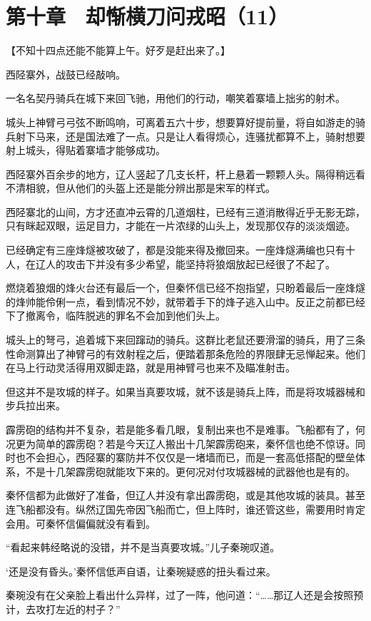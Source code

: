 \section{第十章　却惭横刀问戎昭（11）}

【不知十四点还能不能算上午。好歹是赶出来了。】

西陉寨外，战鼓已经敲响。

一名名契丹骑兵在城下来回飞驰，用他们的行动，嘲笑着寨墙上拙劣的射术。

城头上神臂弓弓弦不断鸣响，可离着五六十步，想要算好提前量，将自如游走的骑兵射下马来，还是国法难了一点。只是让人看得烦心，连骚扰都算不上，骑射想要射上城头，得贴着寨墙才能够成功。

西陉寨外百余步的地方，辽人竖起了几支长杆，杆上悬着一颗颗人头。隔得稍远看不清相貌，但从他们的头盔上还是能分辨出那是宋军的样式。

西陉寨北的山间，方才还直冲云霄的几道烟柱，已经有三道消散得近乎无影无踪，只有眯起双眼，运足目力，才能在一片浓绿的山头上，发现那仅存的淡淡烟迹。

已经确定有三座烽燧被攻破了，都是没能来得及撤回来。一座烽燧满编也只有十人，在辽人的攻击下并没有多少希望，能坚持将狼烟放起已经很了不起了。

燃烧着狼烟的烽火台还有最后一个，但秦怀信已经不抱指望，只盼着最后一座烽燧的烽帅能伶俐一点，看到情况不妙，就带着手下的烽子逃入山中。反正之前都已经下了撤离令，临阵脱逃的罪名不会加到他们头上。

城头上的弩弓，追着城下来回蹿动的骑兵。这群比老鼠还要滑溜的骑兵，用了三条性命测算出了神臂弓的有效射程之后，便踏着那条危险的界限肆无忌惮起来。他们在马上行动灵活得用双脚走路，就是用神臂弓也来不及瞄准射击。

但这并不是攻城的样子。如果当真要攻城，就不该是骑兵上阵，而是将攻城器械和步兵拉出来。

霹雳砲的结构并不复杂，若是能多看几眼，复制出来也不是难事。飞船都有了，何况更为简单的霹雳砲？若是今天辽人搬出十几架霹雳砲来，秦怀信也绝不惊讶。同时也不会担心，西陉寨的寨防并不仅仅是一堵墙而已，而是一套高低搭配的壁垒体系，不是十几架霹雳砲就能攻下来的。更何况对付攻城器械的武器他也是有的。

秦怀信都为此做好了准备，但辽人并没有拿出霹雳砲，或是其他攻城的装具。甚至连飞船都没有。纵然辽国先帝因飞船而亡，但上阵时，谁还管这些，需要用时肯定会用。可秦怀信偏偏就没有看到。

“看起来韩经略说的没错，并不是当真要攻城。”儿子秦琬叹道。

‘还是没有昏头。’秦怀信低声自语，让秦琬疑惑的扭头看过来。

秦琬没有在父亲脸上看出什么异样，过了一阵，他问道：“……那辽人还是会按照预计，去攻打左近的村子？”

